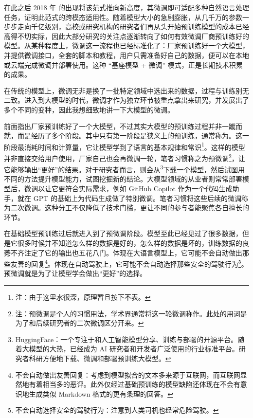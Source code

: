 在此之后 2018 年 的出现将该范式推向新高度，其微调即可适配多种自然语言处理任务，证明此范式的跨模态适用性。随着模型大小的急剧膨胀，从几千万的参数一步步走向千亿级别，高校或研究机构的研究者们再从头开始预训练模型的成本已经高得不切实际，因此大部分研究的关注点逐渐转向了如何有效微调厂商预训练好的模型。从某种程度上，微调这一流程也已经标准化了：厂家预训练好一个大模型，并提供微调接口，全套的脚本和教程，用户只需准备好自己的数据，便可以在本地或云端完成微调并部署使用。这种 “基座模型 + 微调” 模式，正是长期技术积累的成果。

在传统的模型上，微调无非是换了一批特定领域中选出来的数据，过程与训练别无二致。进入到大模型的时代，微调才作为独立环节被重点拿出来研究，并发展出了多个不同的变种，因此我想细致地讲一下大模型的微调。

前面指出厂家预训练好了一个大模型，不过其实大模型的预训练过程并非一蹴而就，而是经历了多个阶段。其中只有第一阶段是狭义上的预训练，通常称为。这一阶段最消耗时间和计算量，它让模型学到了语言的基本规律和常识\footnote{注：由于这里水很深，原理暂且按下不表。}。这样的模型并非直接交给用户使用，厂家自己也会再微调一轮，笔者习惯称之为预微调\footnote{注：预微调是个人的习惯用法，学术界通常将这一轮微调称作。此处的用词是为了和后续研究者的二次微调区分开来。}，让它能够输出“更好”的结果。对于研究者而言，则会从\footnote{HuggingFace：一个专注于和人工智能模型分享、训练与部署的开源平台。随着大模型的大热，已经成为 AI 研究者和开发者广泛使用的行业标准平台。研究者科研方便地下载、微调和部署预训练大模型。}下载一个模型，然后试图用不同的方法提升模型能力，试图挖掘新的结论。大模型领域的从业者则常常部署模型后，微调以让它更符合实际需求，例如 GitHub Copilot 作为一个代码生成助手，就在 GPT 的基础上为代码生成做了特别微调。笔者习惯将这些后续的微调称为二次微调。这种分工不仅降低了技术门槛，更让不同的参与者能聚焦各自擅长的环节。

在基础模型预训练过后就进入到了预微调阶段。模型至此已经见过了很多数据，但是它很多时候并不知道怎么样的数据是好的，怎么样的数据是坏的，训练数据的良莠不齐注定了它的输出也五花八门。体现在大语言模型上，它可能不会自动做出那些友善的回复\footnote{不会自动做出友善回复：考虑到模型拟合的文本多来源于互联网，而互联网显然地有着相当多的恶评。此外仅经过基础预训练的模型缺陷还体现在不会有意识地生成类似 Markdown 格式的更有条理的回答。}。体现在自动驾驶上，它可能不会自动选择那些安全的驾驶行为\footnote{不会自动选择安全的驾驶行为：注意到人类司机也经常危险驾驶。}。预微调就是为了让模型学会做出“更好”的选择。

